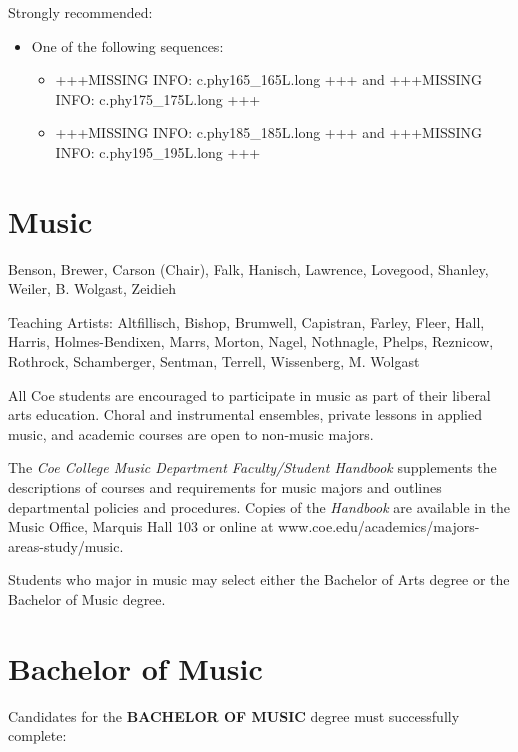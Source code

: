 \documentclass[
  letterpaper,
]{scrbook}
\providecommand{\tightlist}{%
  \setlength{\itemsep}{0pt}\setlength{\parskip}{0pt}}
\begin{document}
Strongly recommended:

\begin{itemize}
\tightlist
\item
  One of the following sequences:

  \begin{itemize}
  \tightlist
  \item
    +++MISSING INFO: c.phy165\_165L.long +++ and +++MISSING INFO:
    c.phy175\_175L.long +++
  \item
    +++MISSING INFO: c.phy185\_185L.long +++ and +++MISSING INFO:
    c.phy195\_195L.long +++
  \end{itemize}
\end{itemize}

\section{Music}\label{sec-music}

Benson, Brewer, Carson (Chair), Falk, Hanisch, Lawrence, Lovegood,
Shanley, Weiler, B. Wolgast, Zeidieh

Teaching Artists: Altfillisch, Bishop, Brumwell, Capistran, Farley,
Fleer, Hall, Harris, Holmes-Bendixen, Marrs, Morton, Nagel, Nothnagle,
Phelps, Reznicow, Rothrock, Schamberger, Sentman, Terrell, Wissenberg,
M. Wolgast

All Coe students are encouraged to participate in music as part of their
liberal arts education. Choral and instrumental ensembles, private
lessons in applied music, and academic courses are open to non-music
majors.

The \emph{Coe College Music Department Faculty/Student Handbook}
supplements the descriptions of courses and requirements for music
majors and outlines departmental policies and procedures. Copies of the
\emph{Handbook} are available in the Music Office, Marquis Hall 103 or
online at www.coe.edu/academics/majors-areas-study/music.

Students who major in music may select either the Bachelor of Arts
degree or the Bachelor of Music degree.

\section{Bachelor of Music}\label{bachelor-of-music}

Candidates for the \textbf{BACHELOR OF MUSIC} degree must successfully
complete:
\end{document}
